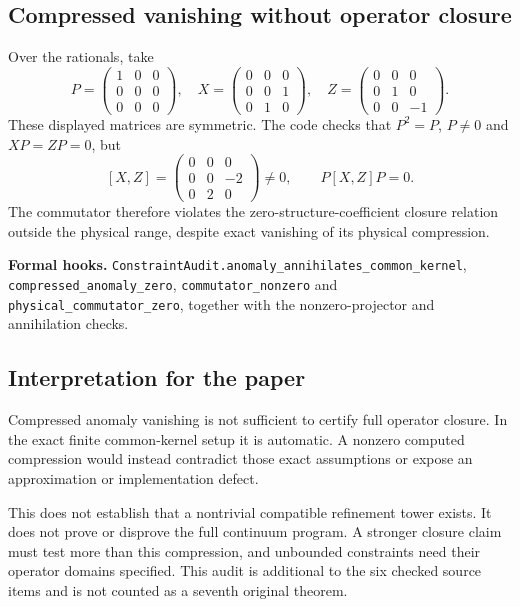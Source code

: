 \documentclass[11pt]{article}
\newcommand{\code}[1]{{\small\nolinkurl{#1}}}
\begin{document}
\subsection*{Compressed vanishing without operator closure}
Over the rationals, take
\[
P=\begin{pmatrix}1&0&0\\0&0&0\\0&0&0\end{pmatrix},\quad
X=\begin{pmatrix}0&0&0\\0&0&1\\0&1&0\end{pmatrix},\quad
Z=\begin{pmatrix}0&0&0\\0&1&0\\0&0&-1\end{pmatrix}.
\]
These displayed matrices are symmetric. The code checks that $P^2=P$, $P\ne0$ and $XP=ZP=0$, but
\[
[X,Z]=\begin{pmatrix}0&0&0\\0&0&-2\\0&2&0\end{pmatrix}\ne0,
\qquad P[X,Z]P=0.
\]
The commutator therefore violates the zero-structure-coefficient closure relation outside the physical range, despite exact vanishing of its physical compression.

\textbf{Formal hooks.} \code{ConstraintAudit.anomaly_annihilates_common_kernel},
\code{compressed_anomaly_zero}, \code{commutator_nonzero} and
\code{physical_commutator_zero}, together with the nonzero-projector and annihilation checks.

\subsection*{Interpretation for the paper}
Compressed anomaly vanishing is not sufficient to certify full operator closure. In the exact finite common-kernel setup it is automatic. A nonzero computed compression would instead contradict those exact assumptions or expose an approximation or implementation defect.

This does not establish that a nontrivial compatible refinement tower exists. It does not prove or disprove the full continuum program. A stronger closure claim must test more than this compression, and unbounded constraints need their operator domains specified. This audit is additional to the six checked source items and is not counted as a seventh original theorem.
\end{document}
